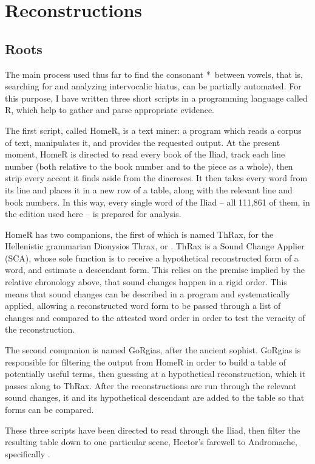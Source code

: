\section{Reconstructions}\label{sec:Recon}

\subsection{Roots}\label{subsec:Roots}
The main process used thus far to find the consonant *\w\ between vowels,
that is, searching for and analyzing intervocalic hiatus, can be
partially automated. For this purpose, I have written three short scripts
in a programming language called R, which help to gather and parse
appropriate evidence.

The first script, called HomeR, is a text miner: a program which reads a
corpus of text, manipulates it, and provides the requested output. At
the present moment, HomeR is directed to read every book of the Iliad,
track each line number (both relative to the book number and to the piece
as a whole), then strip every accent it finds aside from the diaereses.
It then takes every word from its line and places it in a new row of
a table, along with the relevant line and book numbers. In this way, every
single word of the Iliad -- all 111,861 of them, in the edition used here --
is prepared for analysis.

HomeR has two companions, the first of which is named ThRax, for the
Hellenistic grammarian Dionysios Thrax, or .
ThRax is a Sound Change Applier (SCA), whose sole function is to receive
a hypothetical reconstructed form of a word, and estimate a descendant
form. This relies on the premise implied by the relative chronology
above, that sound changes happen in a rigid order. This means that sound
changes can be described in a program and systematically applied, allowing
a reconstructed word form to be passed through a list of changes and
compared to the attested word order in order to test the veracity of the
reconstruction.

The second companion is named GoRgias, after the ancient sophist. GoRgias
is responsible for filtering the output from HomeR in order to build a table of
potentially useful terms, then guessing at a hypothetical reconstruction,
which it passes along to ThRax. After the reconstructions are run through
the relevant sound changes, it and its hypothetical descendant are added
to the table so that forms can be compared.

These three scripts have been directed to read through the Iliad, then
filter the resulting table down to one particular scene, Hector's farewell
to Andromache, specifically . %

